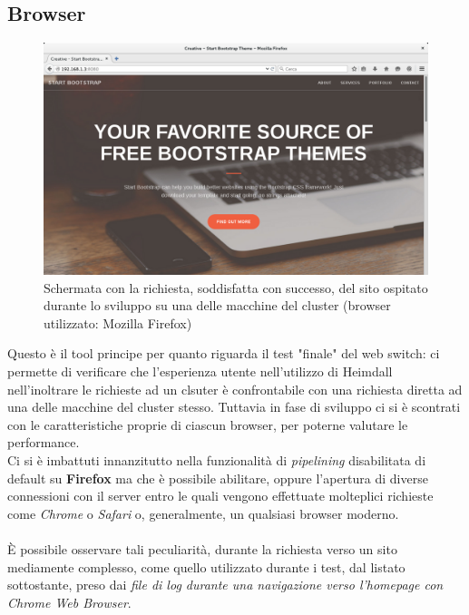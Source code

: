 \documentclass[italian]{tktltiki2}
\begin{document}
\subsection{Browser}
\begin{figure}[h]
\centering
\includegraphics[width=\textwidth]{images/screen_browser}
\caption{Schermata con la richiesta, soddisfatta con successo, del sito ospitato durante lo sviluppo su una delle macchine del cluster (browser utilizzato: Mozilla Firefox)}
\end{figure}
Questo è il tool principe per quanto riguarda il test "finale" del web switch: ci permette di verificare che l'esperienza utente nell'utilizzo di Heimdall nell'inoltrare le richieste ad un clsuter è confrontabile con una richiesta diretta ad una delle macchine del cluster stesso. Tuttavia in fase di sviluppo ci si è scontrati con le caratteristiche proprie di ciascun browser, per poterne valutare le performance.
\\
Ci si è imbattuti innanzitutto nella funzionalità di \emph{pipelining} disabilitata di default su \textbf{Firefox} ma che è possibile abilitare, oppure l'apertura di diverse connessioni con il server entro le quali vengono effettuate molteplici richieste come \emph{Chrome} o \emph{Safari} o, generalmente, un qualsiasi browser moderno.
\\
\\
È possibile osservare tali peculiarità, durante la richiesta verso un sito mediamente complesso, come quello utilizzato durante i test, dal listato sottostante, preso dai \emph{file di log durante una navigazione verso l'homepage con Chrome Web Browser}.
\end{document}
